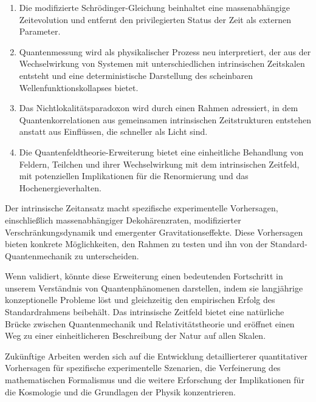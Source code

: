 \documentclass[12pt,a4paper]{article}
\begin{document}
	\begin{enumerate}
		\item Die modifizierte Schrödinger-Gleichung beinhaltet eine massenabhängige Zeitevolution und entfernt den privilegierten Status der Zeit als externen Parameter.
		
		\item Quantenmessung wird als physikalischer Prozess neu interpretiert, der aus der Wechselwirkung von Systemen mit unterschiedlichen intrinsischen Zeitskalen entsteht und eine deterministische Darstellung des scheinbaren Wellenfunktionskollapses bietet.
		
		\item Das Nichtlokalitätsparadoxon wird durch einen Rahmen adressiert, in dem Quantenkorrelationen aus gemeinsamen intrinsischen Zeitstrukturen entstehen anstatt aus Einflüssen, die schneller als Licht sind.
		
		\item Die Quantenfeldtheorie-Erweiterung bietet eine einheitliche Behandlung von Feldern, Teilchen und ihrer Wechselwirkung mit dem intrinsischen Zeitfeld, mit potenziellen Implikationen für die Renormierung und das Hochenergieverhalten.
	\end{enumerate}
	
	Der intrinsische Zeitansatz macht spezifische experimentelle Vorhersagen, einschließlich massenabhängiger Dekohärenzraten, modifizierter Verschränkungsdynamik und emergenter Gravitationseffekte. Diese Vorhersagen bieten konkrete Möglichkeiten, den Rahmen zu testen und ihn von der Standard-Quantenmechanik zu unterscheiden.
	
	Wenn validiert, könnte diese Erweiterung einen bedeutenden Fortschritt in unserem Verständnis von Quantenphänomenen darstellen, indem sie langjährige konzeptionelle Probleme löst und gleichzeitig den empirischen Erfolg des Standardrahmens beibehält. Das intrinsische Zeitfeld bietet eine natürliche Brücke zwischen Quantenmechanik und Relativitätstheorie und eröffnet einen Weg zu einer einheitlicheren Beschreibung der Natur auf allen Skalen.
	
	Zukünftige Arbeiten werden sich auf die Entwicklung detaillierterer quantitativer Vorhersagen für spezifische experimentelle Szenarien, die Verfeinerung des mathematischen Formalismus und die weitere Erforschung der Implikationen für die Kosmologie und die Grundlagen der Physik konzentrieren.
	
\end{document}
